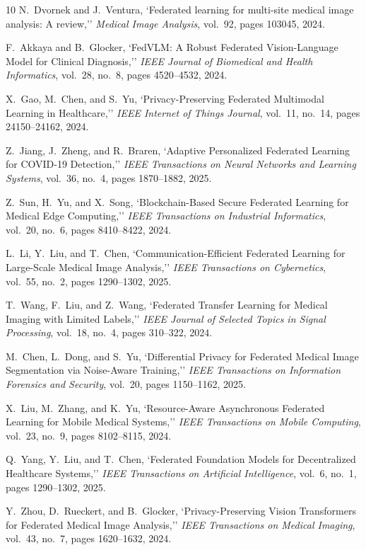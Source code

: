 \documentclass[conference]{IEEEtran}
\begin{document}
\begin{thebibliography}{10}
N.~Dvornek and J.~Ventura,
`Federated learning for multi-site medical image analysis: A review,''
\emph{Medical Image Analysis}, vol.\ 92, pages 103045, 2024.

F.~Akkaya and B.~Glocker,
`FedVLM: A Robust Federated Vision-Language Model for Clinical Diagnosis,''
\emph{IEEE Journal of Biomedical and Health Informatics}, vol.\ 28, no.\ 8, pages 4520--4532, 2024.

X.~Gao, M.~Chen, and S.~Yu,
`Privacy-Preserving Federated Multimodal Learning in Healthcare,''
\emph{IEEE Internet of Things Journal}, vol.\ 11, no.\ 14, pages 24150--24162, 2024.

Z.~Jiang, J.~Zheng, and R.~Braren,
`Adaptive Personalized Federated Learning for COVID-19 Detection,''
\emph{IEEE Transactions on Neural Networks and Learning Systems}, vol.\ 36, no.\ 4, pages 1870--1882, 2025.

Z.~Sun, H.~Yu, and X.~Song,
`Blockchain-Based Secure Federated Learning for Medical Edge Computing,''
\emph{IEEE Transactions on Industrial Informatics}, vol.\ 20, no.\ 6, pages 8410--8422, 2024.

L.~Li, Y.~Liu, and T.~Chen,
`Communication-Efficient Federated Learning for Large-Scale Medical Image Analysis,''
\emph{IEEE Transactions on Cybernetics}, vol.\ 55, no.\ 2, pages 1290--1302, 2025.

T.~Wang, F.~Liu, and Z.~Wang,
`Federated Transfer Learning for Medical Imaging with Limited Labels,''
\emph{IEEE Journal of Selected Topics in Signal Processing}, vol.\ 18, no.\ 4, pages 310--322, 2024.

M.~Chen, L.~Dong, and S.~Yu,
`Differential Privacy for Federated Medical Image Segmentation via Noise-Aware Training,''
\emph{IEEE Transactions on Information Forensics and Security}, vol.\ 20, pages 1150--1162, 2025.

X.~Liu, M.~Zhang, and K.~Yu,
`Resource-Aware Asynchronous Federated Learning for Mobile Medical Systems,''
\emph{IEEE Transactions on Mobile Computing}, vol.\ 23, no.\ 9, pages 8102--8115, 2024.

Q.~Yang, Y.~Liu, and T.~Chen,
`Federated Foundation Models for Decentralized Healthcare Systems,''
\emph{IEEE Transactions on Artificial Intelligence}, vol.\ 6, no.\ 1, pages 1290--1302, 2025.

Y.~Zhou, D.~Rueckert, and B.~Glocker,
`Privacy-Preserving Vision Transformers for Federated Medical Image Analysis,''
\emph{IEEE Transactions on Medical Imaging}, vol.\ 43, no.\ 7, pages 1620--1632, 2024.


\end{thebibliography}
\end{document}
